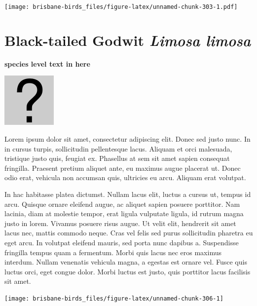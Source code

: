 \documentclass[]{book}
\let\origfigure\figure
\let\endorigfigure\endfigure
\renewenvironment{figure}[1][2] {
  \expandafter\origfigure\expandafter[H]
} {
  \endorigfigure
}
\begin{document}
\begin{figure}
\centering
\texttt{[image: brisbane-birds\_files/figure-latex/unnamed-chunk-303-1.pdf]}
\caption{\label{fig:unnamed-chunk-303}insert figure caption}
\end{figure}

\section{\texorpdfstring{Black-tailed Godwit \emph{Limosa
limosa}}{Black-tailed Godwit Limosa limosa}}\label{black-tailed-godwit-limosa-limosa}

\textbf{species level text in here}

\begin{figure}
\centering
\includegraphics{assets/missing.png}
\caption{No image for species}
\end{figure}

Lorem ipsum dolor sit amet, consectetur adipiscing elit. Donec sed justo
nunc. In in cursus turpis, sollicitudin pellentesque lacus. Aliquam et
orci malesuada, tristique justo quis, feugiat ex. Phasellus at sem sit
amet sapien consequat fringilla. Praesent pretium aliquet ante, eu
maximus augue placerat ut. Donec odio erat, vehicula non accumsan quis,
ultricies eu arcu. Aliquam erat volutpat.

In hac habitasse platea dictumst. Nullam lacus elit, luctus a cursus ut,
tempus id arcu. Quisque ornare eleifend augue, ac aliquet sapien posuere
porttitor. Nam lacinia, diam at molestie tempor, erat ligula vulputate
ligula, id rutrum magna justo in lorem. Vivamus posuere risus augue. Ut
velit elit, hendrerit sit amet lacus nec, mattis commodo neque. Cras vel
felis sed purus sollicitudin pharetra eu eget arcu. In volutpat eleifend
mauris, sed porta nunc dapibus a. Suspendisse fringilla tempus quam a
fermentum. Morbi quis lacus nec eros maximus interdum. Nullam venenatis
vehicula magna, a egestas est ornare vel. Fusce quis luctus orci, eget
congue dolor. Morbi luctus est justo, quis porttitor lacus facilisis sit
amet.

\begin{figure}
\texttt{[image: brisbane-birds\_files/figure-latex/unnamed-chunk-306-1]} \caption{insert figure caption}\label{fig:unnamed-chunk-306}
\end{figure}
\end{document}

